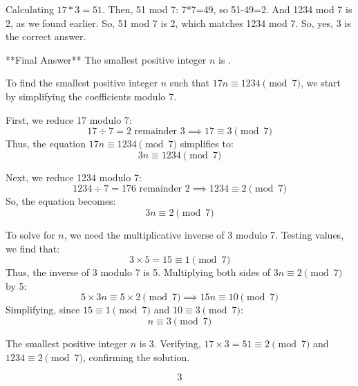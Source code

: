 \begin{tcolorbox}[modelbox, title=SPO-tree]
Calculating \( 17*3 = 51 \). Then, 51 mod 7: 7*7=49, so 51-49=2. And 1234 mod 7 is 2, as we found earlier. So, 51 mod 7 is 2, which matches 1234 mod 7. So, yes, 3 is the correct answer.

**Final Answer**
The smallest positive integer \( n \) is .


To find the smallest positive integer \( n \) such that \( 17n \equiv 1234 \pmod{7} \), we start by simplifying the coefficients modulo 7.

First, we reduce 17 modulo 7:
\[
17 \div 7 = 2 \text{ remainder } 3 \implies 17 \equiv 3 \pmod{7}
\]
Thus, the equation \( 17n \equiv 1234 \pmod{7} \) simplifies to:
\[
3n \equiv 1234 \pmod{7}
\]

Next, we reduce 1234 modulo 7:
\[
1234 \div 7 = 176 \text{ remainder } 2 \implies 1234 \equiv 2 \pmod{7}
\]
So, the equation becomes:
\[
3n \equiv 2 \pmod{7}
\]

To solve for \( n \), we need the multiplicative inverse of 3 modulo 7. Testing values, we find that:
\[
3 \times 5 = 15 \equiv 1 \pmod{7}
\]
Thus, the inverse of 3 modulo 7 is 5. Multiplying both sides of \( 3n \equiv 2 \pmod{7} \) by 5:
\[
5 \times 3n \equiv 5 \times 2 \pmod{7} \implies 15n \equiv 10 \pmod{7}
\]
Simplifying, since \( 15 \equiv 1 \pmod{7} \) and \( 10 \equiv 3 \pmod{7} \):
\[
n \equiv 3 \pmod{7}
\]

The smallest positive integer \( n \) is 3. Verifying, \( 17 \times 3 = 51 \equiv 2 \pmod{7} \) and \( 1234 \equiv 2 \pmod{7} \), confirming the solution.

\[
\boxed{3}
\]
\end{tcolorbox}


